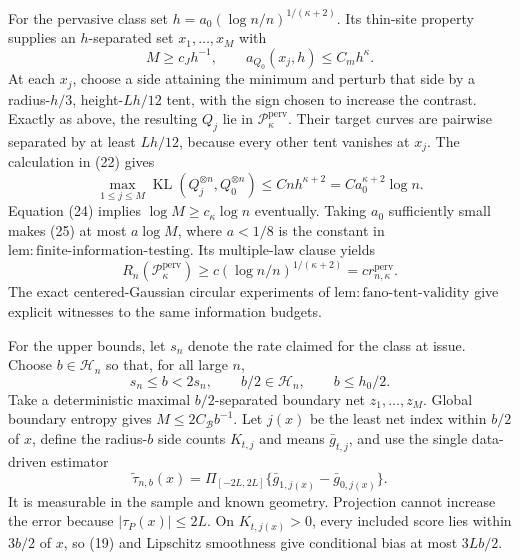 For the pervasive class set \(h=a_0(\log n/n)^{1/(\kappa+2)}\). Its thin-site property supplies an \(h\)-separated set \(x_1,\ldots,x_M\) with
\[
 M\ge c_Jh^{-1},\qquad a_{Q_0}(x_j,h)\le C_mh^\kappa. \tag{24}
\]
At each \(x_j\), choose a side attaining the minimum and perturb that side by a radius-\(h/3\), height-\(Lh/12\) tent, with the sign chosen to increase the contrast. Exactly as above, the resulting \(Q_j\) lie in \(\mathcal P_\kappa^{\mathrm{perv}}\). Their target curves are pairwise separated by at least \(Lh/12\), because every other tent vanishes at \(x_j\). The calculation in (22) gives
\[
 \max_{1\le j\le M}\operatorname{KL}(Q_j^{\otimes n},Q_0^{\otimes n})
 \le Cnh^{\kappa+2}=Ca_0^{\kappa+2}\log n. \tag{25}
\]
Equation (24) implies \(\log M\ge c_\kappa\log n\) eventually. Taking \(a_0\) sufficiently small makes (25) at most \(a\log M\), where \(a<1/8\) is the constant in \(\mathrm{lem:finite\text{-}information\text{-}testing}\). Its multiple-law clause yields
\[
 R_n(\mathcal P_\kappa^{\mathrm{perv}})\ge c(\log n/n)^{1/(\kappa+2)}=c r_{n,\kappa}^{\mathrm{perv}}. \tag{26}
\]
The exact centered-Gaussian circular experiments of \(\mathrm{lem:fano\text{-}tent\text{-}validity}\) give explicit witnesses to the same information budgets.

For the upper bounds, let \(s_n\) denote the rate claimed for the class at issue. Choose \(b\in\mathcal H_n\) so that, for all large \(n\),
\[
 s_n\le b<2s_n,\qquad b/2\in\mathcal H_n,\qquad b\le h_0/2. \tag{27}
\]
Take a deterministic maximal \(b/2\)-separated boundary net \(z_1,\ldots,z_M\). Global boundary entropy gives \(M\le2C_{\mathcal B}b^{-1}\). Let \(j(x)\) be the least net index within \(b/2\) of \(x\), define the radius-\(b\) side counts \(K_{t,j}\) and means \(\bar g_{t,j}\), and use the single data-driven estimator
\[
 \widetilde\tau_{n,b}(x)=\Pi_{[-2L,2L]}\{\bar g_{1,j(x)}-\bar g_{0,j(x)}\}. \tag{28}
\]
It is measurable in the sample and known geometry. Projection cannot increase the error because \(|\tau_P(x)|\le2L\). On \(K_{t,j(x)}>0\), every included score lies within \(3b/2\) of \(x\), so (19) and Lipschitz smoothness give conditional bias at most \(3Lb/2\).

